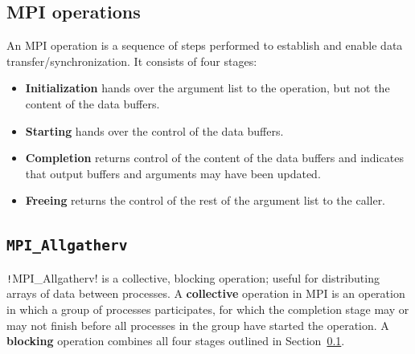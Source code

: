 \documentclass[thesis=M,english]{FITthesis}[2019/12/23]
\newcommand{\csre}[1]{\texttt!#1!}
\begin{document}
\subsection{MPI operations}\label{tech:mpi:op}

An MPI operation is a sequence of steps performed to establish and enable data transfer/synchronization\cite{mpi40}.
It consists of four stages:

\begin{itemize}
    \item \textbf{Initialization} hands over the argument list to the operation, but not the content
          of the data buffers.
    \item \textbf{Starting} hands over the control of the data buffers.
    \item \textbf{Completion} returns control of the content of the data buffers and indicates
          that output buffers and arguments may have been updated.
    \item \textbf{Freeing} returns the control of the rest of the argument list to the caller.

\end{itemize}


\subsection{\texttt{MPI\_Allgatherv}}\label{tech:mpi:gat}

\csre{MPI_Allgatherv} is a collective, blocking operation; useful for distributing arrays of
data between processes. A \textbf{collective} operation in MPI is an operation in which a group of
processes participates, for which the completion
stage may or may not finish before all processes in the group have started the operation.
A \textbf{blocking} operation combines all four stages outlined in Section~\ref{tech:mpi:op}.
\end{document}
